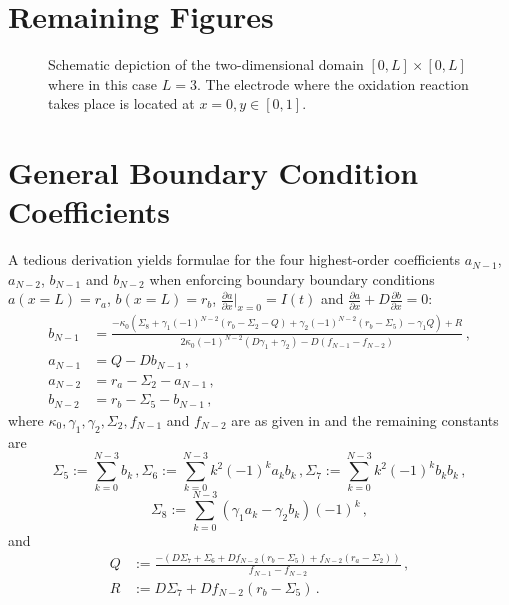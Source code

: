\documentclass{prettytex/ox/mmsc-special-topic}
\begin{document}
  \section{Remaining Figures}
  \begin{figure}[H]
    \centering
    \caption{Schematic depiction of the two-dimensional domain $[0, L] \times [0, L]$ where in this case $L = 3$. The electrode where the oxidation reaction takes place is located at $x=0, y \in [0, 1]$.}
    \label{fig:2d-case}
  \end{figure}

  \section{General Boundary Condition Coefficients}
  \label{sec:general-case}
  A tedious derivation yields formulae for the four highest-order coefficients $a_{N-1}$, $a_{N-2}$, $b_{N-1}$ and $b_{N-2}$ when enforcing boundary boundary conditions $a(x=L) = r_a$, $b(x=L) = r_b$, $\frac{\partial a}{\partial x}\big|_{x=0} = I(t)$ and $\frac{\partial a}{\partial x} + D \frac{\partial b}{\partial x} = 0$:
  \begin{align*}
    b_{N-1} & = \frac{-\kappa_0 \left(\Sigma_8 + \gamma_1 (-1)^{N-2}(r_b - \Sigma_2 - Q) + \gamma_2 (-1)^{N-2} (r_b - \Sigma_5) - \gamma_1 Q\right) + R}{2 \kappa_0 (-1)^{N-2} (D \gamma_1 + \gamma_2) - D (f_{N-1} - f_{N-2})}\,, \\
    a_{N-1} & = Q - D b_{N-1}\,,                                                                                                                                                                                                   \\
    a_{N-2} & = r_a - \Sigma_2 - a_{N-1}\,,                                                                                                                                                                                        \\
    b_{N-2} & = r_b - \Sigma_5 - b_{N-1}\,,
  \end{align*}
  where $\kappa_0, \gamma_1, \gamma_2, \Sigma_2, f_{N-1}$ and $f_{N-2}$ are as given in  and the remaining constants are
  $$\Sigma_5 := \sum_{k=0}^{N-3} b_k\,,
    \Sigma_6 := \sum_{k=0}^{N-3} k^2 (-1)^k a_k b_k\,,
    \Sigma_7 := \sum_{k=0}^{N-3} k^2 (-1)^k b_k b_k\,,$$
  $$\Sigma_8 := \sum_{k=0}^{N-3} (\gamma_1 a_k - \gamma_2 b_k)(-1)^k\,,$$
  and
  \begin{align*}
    Q & := \frac{-\left(D \Sigma_7 + \Sigma_6 + D f_{N-2} (r_b - \Sigma_5) + f_{N-2} (r_a - \Sigma_2)\right)}{f_{N-1} - f_{N-2}}\,, \\
    R & := D \Sigma_7 + D f_{N-2} (r_b - \Sigma_5)\,.
  \end{align*}
\end{document}
